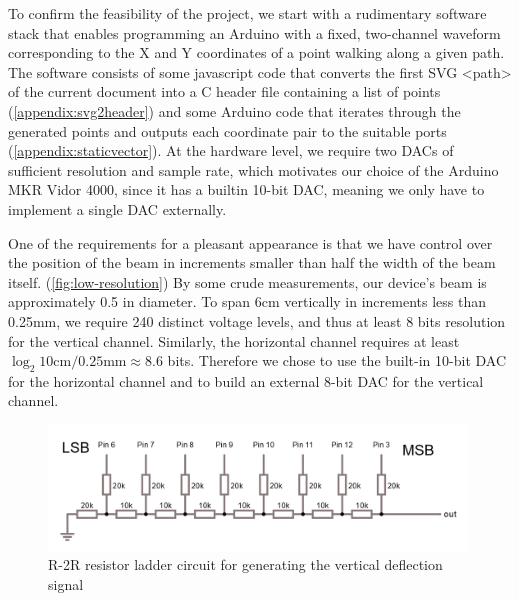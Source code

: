 \documentclass[12pt]{article}
\begin{document}
To confirm the feasibility of the project, we start with a rudimentary software stack that enables programming an Arduino with a fixed, two-channel waveform corresponding to the X and Y coordinates of a point walking along a given path. The software consists of some javascript code that converts the first SVG <path> of the current document into a C header file containing a list of points (\autoref{appendix:svg2header}) and some Arduino code that iterates through the generated points and outputs each coordinate pair to the suitable ports (\autoref{appendix:staticvector}). At the hardware level, we require two DACs of sufficient resolution and sample rate, which motivates our choice of the Arduino MKR Vidor 4000, since it has a builtin 10-bit DAC, meaning we only have to implement a single DAC externally.

One of the requirements for a pleasant appearance is that we have control over the position of the beam in increments smaller than half the width of the beam itself. (\autoref{fig:low-resolution}) By some crude measurements, our device's beam is approximately 0.5 in diameter. To span 6cm vertically in increments less than 0.25mm, we require 240 distinct voltage levels, and thus at least 8 bits resolution for the vertical channel. Similarly, the horizontal channel requires at least \( \log_2{10\text{cm}/0.25\text{mm}} \approx 8.6 \) bits. Therefore we chose to use the built-in 10-bit DAC for the horizontal channel and to build an external 8-bit DAC for the vertical channel.

\begin{figure}[h]
\centering
\includegraphics[width=0.99\textwidth]{images/r2r-circuit.png}
\caption{R-2R resistor ladder circuit for generating the vertical deflection signal}
\end{figure}
\end{document}
